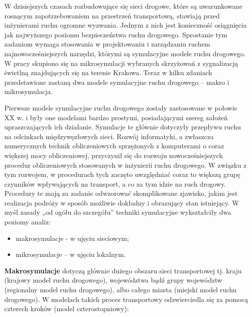 \documentclass{sprawozdanie-agh}
\begin{document}
	W dzisiejszych czasach rozbudowujące się sieci drogowe, które są uwarunkowane rosnącym zapotrzebowaniem na przestrzeń transportową, stawiają przed inżynierami ruchu ogromne wyzwania. Jednym z nich jest konieczność osiągnięcia jak najwyższego poziomu bezpieczeństwa ruchu drogowego. Sprostanie tym zadaniom wymaga stosowania w projektowaniu i zarządzaniu ruchem najnowocześniejszych narzędzi, którymi są symulacyjne modele ruchu drogowego.
	W pracy skupiono się na mikrosymulacji wybranych skrzyżowań z sygnalizacją świetlną znajdujących się na terenie Krakowa. Teraz w kilku zdaniach przedstawione zastaną dwa modele symulacyjne ruchu drogowego – makro i mikrosymulacja.

	Pierwsze modele symulacyjne ruchu drogowego zostały zastosowane w połowie XX w. i były one modelami bardzo prostymi, posiadającymi szereg założeń upraszczających ich działanie. Symulacje te głównie dotyczyły przepływu ruchu na odcinkach międzywęzłowych sieci. Rozwój informatyki, a zwłaszcza numerycznych technik obliczeniowych sprzężonych z komputerami o coraz większej mocy obliczeniowej, przyczynił się do rozwoju nowocześniejszych procedur obliczeniowych stosowanych w inżynierii ruchu drogowego. W związku z tym rozwojem, w procedurach tych zaczęto uwzględniać coraz to większą grupę czynników wpływających na transport, a co za tym idzie na ruch drogowy. Procedury te mają za zadanie odwzorować skomplikowane zjawisko, jakim jest realizacja podróży w sposób możliwie dokładny i obrazujący stan istniejący. W myśl zasady „od ogółu do szczegółu” techniki symulacyjne wykształciły dwa poziomy analiz:

	\begin{itemize}
		\item makrosymulacje - w ujęciu sieciowym;
		\item mikrosymulacje – w ujęciu lokalnym.
	\end{itemize}


	\textbf{Makrosymulacje} dotyczą głównie dużego obszaru sieci transportowej tj. kraju (krajowy model ruchu drogowego), województwa bądź grupy województw (regionalny model ruchu drogowego), albo całego miasta (miejski model ruchu drogowego). W modelach takich proces transportowy odzwierciedla się za pomocą czterech kroków (model czterostopniowy):
\end{document}
